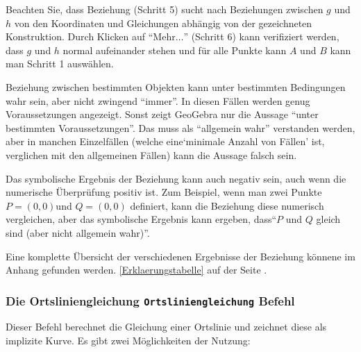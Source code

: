 \documentclass{article}
\begin{document}
Beachten Sie, dass Beziehung (Schritt 5) sucht nach Beziehungen zwischen $g$ und $h$ von den Koordinaten und Gleichungen abhängig von der gezeichneten Konstruktion. Durch Klicken auf ``Mehr$\ldots$'' (Schritt 6) kann verifiziert werden, dass $g$ und $h$ normal aufeinander stehen und für alle Punkte kann $A$ und $B$ kann man Schritt 1 auswählen.

Beziehung zwischen bestimmten Objekten kann unter bestimmten Bedingungen wahr sein, aber nicht zwingend  ``immer''. In diesen Fällen werden genug Voraussetzungen angezeigt. Sonst zeigt GeoGebra nur die Aussage  ``unter bestimmten Voraussetzungen''. Das muss als ``allgemein wahr'' verstanden werden, aber in manchen Einzelfällen (welche eine`minimale Anzahl von Fällen' ist, verglichen mit den allgemeinen Fällen) kann die Aussage falsch sein.

Das symbolische Ergebnis der Beziehung kann auch negativ sein, auch wenn die numerische Überprüfung positiv ist. Zum Beispiel, wenn man zwei Punkte $P=(0,0)$und $Q=(0,0)$ definiert, kann die Beziehung diese numerisch vergleichen, aber das symbolische Ergebnis kann ergeben, dass``$P$ und $Q$ gleich sind (aber nicht allgemein wahr)''.

Eine komplette Übersicht der verschiedenen Ergebnisse der Beziehung könnene im Anhang gefunden werden. \ref{Erklaerungstabelle} auf der Seite \pageref{Erklaerungstabelle}.

\subsubsection{Die Ortsliniengleichung \texttt{Ortsliniengleichung} Befehl}

Dieser Befehl berechnet die Gleichung einer Ortslinie und zeichnet diese als implizite Kurve. Es gibt zwei Möglichkeiten der Nutzung:
\end{document}

